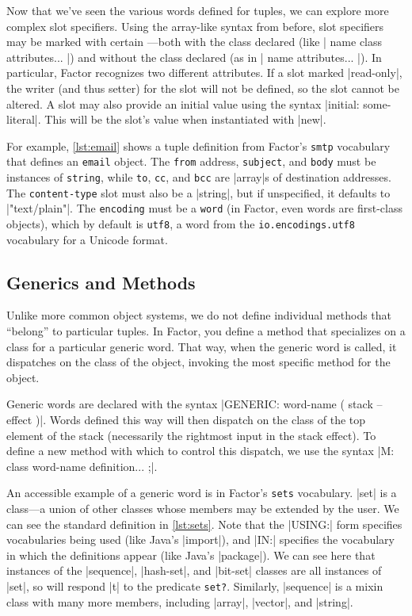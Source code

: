
Now that we've seen the various words defined for tuples, we can explore more
complex slot specifiers.  Using the array-like syntax from before, slot
specifiers may be marked with certain ---both with the class
declared (like
%
\factor|{ name class attributes... }|)
%
and without the class declared (as in 
%
\factor|{ name attributes... }|).
%
In particular, Factor recognizes two different attributes.  If a slot marked
\factor|read-only|, the writer (and thus setter) for the slot will not be
defined, so the slot cannot be altered.  A slot may also provide an initial
value using the syntax \factor|initial: some-literal|.  This will be the slot's
value when instantiated with \factor|new|. 

For example, \vref{lst:email} shows a tuple definition from Factor's
\Verb|smtp| vocabulary that defines an \Verb|email| object.  The
\Verb|from| address, \Verb|subject|, and \Verb|body| must be instances of
\Verb|string|, while \Verb|to|, \Verb|cc|, and \Verb|bcc| are
\factor|array|s of destination addresses.  The \Verb|content-type| slot must
also be a \factor|string|, but if unspecified, it defaults to
\factor|"text/plain"|.  The \Verb|encoding| must be a \Verb|word| (in
Factor, even words are first-class objects), which by default is \Verb|utf8|,
a word from the \Verb|io.encodings.utf8| vocabulary for a Unicode format.

\subsection{Generics and Methods}

Unlike more common object systems, we do not define individual methods that
``belong'' to particular tuples.  In Factor, you define a method that
specializes on a class for a particular generic word.  That way, when the
generic word is called, it dispatches on the class of the object, invoking the
most specific method for the object.

Generic words are declared with the syntax
%
\factor|GENERIC: word-name ( stack -- effect )|.
%
Words defined this way will then dispatch on the class of the top element of
the stack (necessarily the rightmost input in the stack effect).  To define a
new method with which to control this dispatch, we use the syntax
%
\factor|M: class word-name definition... ;|.


An accessible example of a generic word is in Factor's \Verb|sets|
vocabulary.  \factor|set| is a  class---a union of other classes
whose members may be extended by the user.  We can see the standard definition
in \vref{lst:sets}.  Note that the \factor|USING:| form specifies vocabularies
being used (like Java's |import|), and \factor|IN:| specifies the
vocabulary in which the definitions appear (like Java's |package|).
We can see here that instances of the \factor|sequence|, \factor|hash-set|, and
\factor|bit-set| classes are all instances of \factor|set|, so will respond
\factor|t| to the predicate \Verb|set?|.  Similarly, \factor|sequence| is a
mixin class with many more members, including \factor|array|, \factor|vector|,
and \factor|string|.

